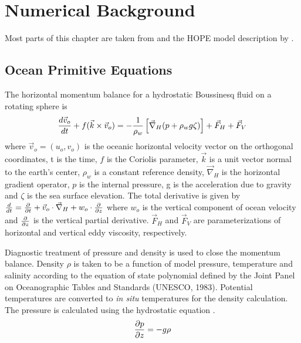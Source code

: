 %
%



\thispagestyle{empty}
 
\chapter[Numerical Background]
{\Large{\bf Numerical Background}}
\label{ch:numeric}

Most parts of this chapter are taken from \citet{Marsland:2003} and the {HOPE} model description by \citet{wolff97}.

\section{Ocean Primitive Equations}

The horizontal momentum balance 
for a hydrostatic Boussinesq fluid on a rotating sphere is
\begin{equation}
\label{eqn:mom}
{d{\vec v}_o\over{dt}} + f({\vec k}\times{\vec v}_o) =
- {1\over\rho_w}
\left[
{\vec \nabla}_H(p+\rho_wg\zeta)
\right]
+ {\vec F}_H + {\vec F}_V
\end{equation}
where ${\vec v}_o  = (u_o,v_o)$ is the oceanic horizontal velocity
vector on the orthogonal coordinates,
t is the time,
$f$ is the Coriolis parameter,
$\vec{k}$ is a unit vector normal to the earth's center,
$\rho_w$ is a constant reference density,
${\vec \nabla}_H$ is the horizontal gradient operator,
$p$ is the internal pressure,
g is the acceleration due to gravity
and $\zeta$ is the sea surface elevation.
The total derivative is given by
${d\over{dt}} = {\partial \over{\partial t}} +
\vec{v}_o\cdot {\vec \nabla}_H +
w_o \cdot {\partial \over{\partial z}}$
where $w_o$ is the vertical component of ocean velocity
and ${\partial \over{\partial z}}$ is the vertical partial derivative.
${\vec F}_H$ and ${\vec F}_V$ are parameterizations of horizontal and vertical eddy viscosity, respectively.

Diagnostic treatment of pressure and density
is used to close the momentum balance.
Density $\rho$ is taken to be a function of model pressure,
temperature and salinity according to the
equation of state polynomial defined by
the Joint Panel on Oceanographic Tables and Standards (UNESCO, 1983).
\nocite{unesco83}
Potential temperatures are converted to {\em in situ}
temperatures for the density calculation.
The pressure is calculated using the
hydrostatic equation%
.
\begin{equation}
\label{eqn:hydrostatic}
{\partial p \over{\partial z}}= -g\rho
\end{equation}

